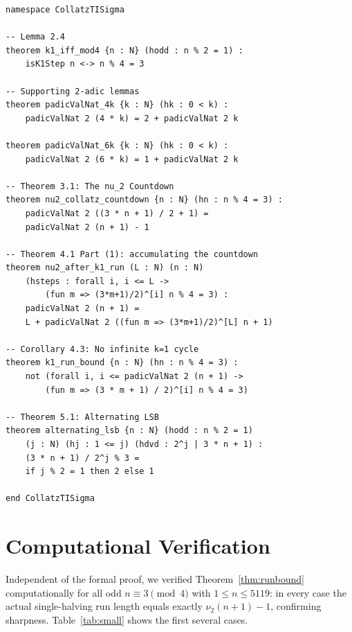 \documentclass[12pt]{article}
\newcommand{\vp}{\nu_2}
\begin{document}
\begin{lstlisting}[style=lean4]
namespace CollatzTISigma

-- Lemma 2.4
theorem k1_iff_mod4 {n : N} (hodd : n % 2 = 1) :
    isK1Step n <-> n % 4 = 3

-- Supporting 2-adic lemmas
theorem padicValNat_4k {k : N} (hk : 0 < k) :
    padicValNat 2 (4 * k) = 2 + padicValNat 2 k

theorem padicValNat_6k {k : N} (hk : 0 < k) :
    padicValNat 2 (6 * k) = 1 + padicValNat 2 k

-- Theorem 3.1: The nu_2 Countdown
theorem nu2_collatz_countdown {n : N} (hn : n % 4 = 3) :
    padicValNat 2 ((3 * n + 1) / 2 + 1) =
    padicValNat 2 (n + 1) - 1

-- Theorem 4.1 Part (1): accumulating the countdown
theorem nu2_after_k1_run (L : N) (n : N)
    (hsteps : forall i, i <= L ->
        (fun m => (3*m+1)/2)^[i] n % 4 = 3) :
    padicValNat 2 (n + 1) =
    L + padicValNat 2 ((fun m => (3*m+1)/2)^[L] n + 1)

-- Corollary 4.3: No infinite k=1 cycle
theorem k1_run_bound {n : N} (hn : n % 4 = 3) :
    not (forall i, i <= padicValNat 2 (n + 1) ->
        (fun m => (3 * m + 1) / 2)^[i] n % 4 = 3)

-- Theorem 5.1: Alternating LSB
theorem alternating_lsb {n : N} (hodd : n % 2 = 1)
    (j : N) (hj : 1 <= j) (hdvd : 2^j | 3 * n + 1) :
    (3 * n + 1) / 2^j % 3 =
    if j % 2 = 1 then 2 else 1

end CollatzTISigma
\end{lstlisting}

\section{Computational Verification}

Independent of the formal proof, we verified Theorem~\ref{thm:runbound}
computationally for all odd $n\equiv 3\pmod 4$ with $1\leq n\leq 5119$:
in every case the actual single-halving run length equals exactly
$\vp(n+1)-1$, confirming sharpness.  Table~\ref{tab:small} shows the
first several cases.
\end{document}
